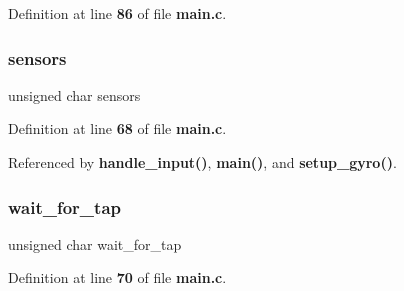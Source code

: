 Definition at line \textbf{ 86} of file \textbf{ main.\+c}.

\mbox{\label{group__eMPL_gaaa21c01566947e7007476657cb614e3f}} 
\subsubsection{sensors}
{\footnotesize\ttfamily unsigned char sensors}



Definition at line \textbf{ 68} of file \textbf{ main.\+c}.



Referenced by \textbf{ handle\+\_\+input()}, \textbf{ main()}, and \textbf{ setup\+\_\+gyro()}.

\mbox{\label{group__eMPL_ga4028a8e467f1dc2db3018a557c353e8d}} 
\subsubsection{wait\+\_\+for\+\_\+tap}
{\footnotesize\ttfamily unsigned char wait\+\_\+for\+\_\+tap}



Definition at line \textbf{ 70} of file \textbf{ main.\+c}.

